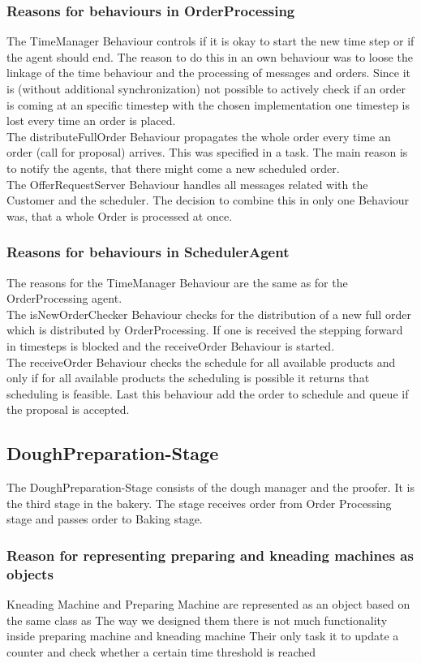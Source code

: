 \documentclass[10pt,a4paper]{article}
\begin{document}
	\subsubsection{Reasons for behaviours in OrderProcessing}
	The TimeManager Behaviour controls if it is okay to start the new time step or if the agent should end. The reason to do this in an own behaviour was to loose the linkage of the time behaviour and the processing of messages and orders. Since it is (without additional synchronization) not possible to actively check if an order is coming at an specific timestep with the chosen implementation one timestep is lost every time an order is placed.
	\\
	The distributeFullOrder Behaviour propagates the whole order every time an order (call for proposal) arrives. This was specified in a task. The main reason is to notify the agents, that there might come a new scheduled order.
	\\
	The OfferRequestServer Behaviour handles all messages related with the Customer and the scheduler. The decision to combine this in only one Behaviour was, that a whole Order is processed at once.
	
	\subsubsection{Reasons for behaviours in SchedulerAgent}
	The reasons for the TimeManager Behaviour are the same as for the OrderProcessing agent.
	\\
	The isNewOrderChecker Behaviour checks for the distribution of a new full order which is distributed by OrderProcessing. If one is received the stepping forward in timesteps is blocked and the receiveOrder Behaviour is started.
	\\
	The receiveOrder Behaviour checks the schedule for all available products and only if for all available products the scheduling is possible it returns that scheduling is feasible. Last this behaviour add the order to schedule and queue if the proposal is accepted.
	
	\subsection{DoughPreparation-Stage}
    The DoughPreparation-Stage consists of the dough manager and the proofer. It is the third stage in the bakery. The stage receives order from Order Processing stage
    and passes order to Baking stage.
		\subsubsection{Reason for representing preparing and kneading machines as objects}
		Kneading Machine and Preparing Machine are represented as an object based on the same class as
		The way we designed them there is not much functionality inside preparing machine and kneading machine
		Their only task it to update a counter and check whether a certain time threshold is reached
\end{document}
